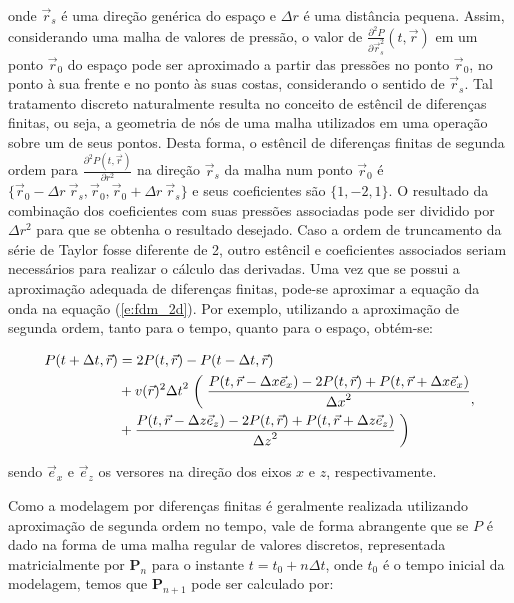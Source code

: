     \noindent onde $\vec{r}_s$ é uma direção genérica do espaço e $\Delta r$ é uma distância pequena. Assim, considerando uma malha de valores de pressão, o valor de $\frac{\partial^2 P}{\partial\vec{r}_s^2}(t,\vec{r})$ em um ponto $\vec{r}_0$ do espaço pode ser aproximado a partir das pressões no ponto $\vec{r}_0$, no ponto à sua frente e no ponto às suas costas, considerando o sentido de $\vec{r}_s$. Tal tratamento discreto naturalmente resulta no conceito de estêncil de diferenças finitas, ou seja, a geometria de nós de uma malha utilizados em uma operação sobre um de seus pontos. Desta forma, o estêncil de diferenças finitas de segunda ordem para $\frac{\partial^2 P(t,\vec{r})}{\partial r^2}$ na direção $\vec{r}_s$ da malha num ponto $\vec{r}_0$ é $\{\vec{r}_0 - {\Delta r}\ \vec{r}_s, \vec{r}_0, \vec{r}_0+{\Delta r}\ \vec{r}_s\}$ e seus coeficientes são $\{1, -2, 1\}$. O resultado da combinação dos coeficientes com suas pressões associadas pode ser dividido por $\Delta r^2$ para que se obtenha o resultado desejado. Caso a ordem de truncamento da série de Taylor fosse diferente de 2, outro estêncil e coeficientes associados seriam necessários para realizar o cálculo das derivadas. Uma vez que se possui a aproximação adequada de diferenças finitas, pode-se aproximar a equação da onda na equação (\ref{e:fdm_2d}). Por exemplo, utilizando a aproximação de segunda ordem, tanto para o tempo, quanto para o espaço, obtém-se:

    \begin{equation} \label{e:fdm_2d_ordem_2}
      \begin{split}
        P(t+\Delta t,\vec{r}) & =  2 P(t,\vec{r}) - P(t-\Delta t,\vec{r}) \\
          & + v(\vec{r})^2 {\Delta t}^2 \biggm( \frac{P(t, \vec{r}-{\Delta x} \vec{e}_x) - 2P(t, \vec{r}) + P(t, \vec{r}+{\Delta x}\vec{e}_x)}{{\Delta x}^2} \\
          & + \frac{P(t,\vec{r}-{\Delta z} \vec{e}_z)-2P(t,\vec{r})+P(t, \vec{r}+{\Delta z} \vec{e}_z)}{{\Delta z}^2} \biggm)
      \end{split},  %
    \end{equation}

    \noindent sendo $\vec{e}_x$ e $\vec{e}_z$ os versores na direção dos eixos $x$ e $z$, respectivamente.

    Como a modelagem por diferenças finitas é geralmente realizada utilizando aproximação de segunda ordem no tempo, vale de forma abrangente que se $P$ é dado na forma de uma malha regular de valores discretos, representada matricialmente por $\boldsymbol{P}_{n}$ para o instante $t=t_0+n\Delta t$, onde $t_0$ é o tempo inicial da modelagem, temos que $\boldsymbol{P}_{n+1}$ pode ser calculado por:

